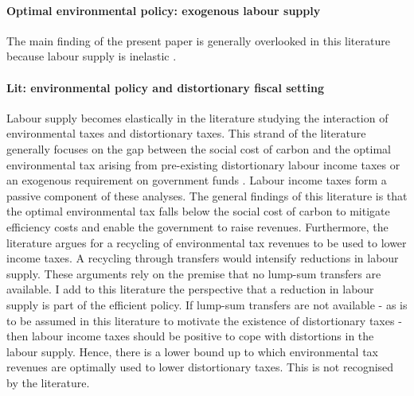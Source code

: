   \paragraph{Optimal environmental policy: exogenous labour supply}
The main finding of the present paper is generally overlooked in this literature because labour supply is inelastic \citep{Golosov2014OptimalEquilibrium, Acemoglu2002DirectedChange}. 
 
\paragraph{Lit: environmental policy and distortionary fiscal setting}
Labour supply becomes elastically in the literature studying the interaction of environmental taxes and distortionary taxes.  This strand of the literature generally focuses on the gap between the social cost of carbon and the optimal environmental tax arising from pre-existing distortionary labour income taxes or an exogenous requirement on government funds \citep{Bovenberg1997EnvironmentalGrowth,  Kaplow2012OPTIMALTAXATION, Jacobs2019RedistributionCurves, Barrage2019OptimalPolicy}. Labour income taxes form a passive component of these analyses. 
The general findings of this literature is that the optimal environmental tax falls below the social cost of carbon to mitigate efficiency costs and enable the government to raise revenues. 
Furthermore, the literature argues for a recycling of environmental tax revenues to be used to lower income taxes. A recycling through transfers would intensify reductions in labour supply. These arguments rely on the premise that no lump-sum transfers are available. I add to this literature the perspective that a reduction in labour supply is part of the efficient policy. If lump-sum transfers are not available - as is to be assumed in this literature to motivate the existence of distortionary taxes - then labour income taxes should be positive to cope with distortions in the labour supply. Hence, there is a lower bound up to which environmental tax revenues are optimally used to lower distortionary taxes. This is not recognised by the literature. 

